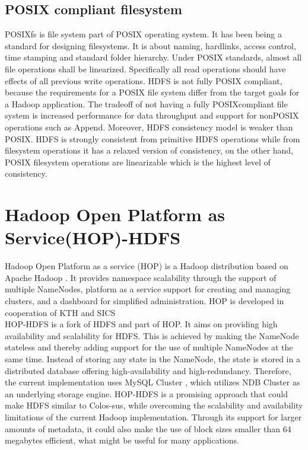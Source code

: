 \subsection{POSIX compliant filesystem}
POSIXfs   is   file  system   part  of  POSIX  operating  system.  It  has   been  being  a  standard  for
designing  filesystems.  It  is   about  naming,  hardlinks,  access   control,  time  stamping  and
standard  folder  hierarchy.  Under  POSIX  standards,  almost  all  file  operations   shall  be
linearized.  Specifically   all  read  operations   should  have  effects   of  all  previous   write
operations.
HDFS  is   not  fully  POSIX compliant, because the requirements  for a POSIX file system  differ
from   the  target  goals   for  a  Hadoop  application.  The  tradeoff  of  not  having  a  fully
POSIXcompliant  file  system   is   increased  performance  for  data  throughput  and  support  for
nonPOSIX  operations   such  as   Append.  Moreover,  HDFS  consistency   model  is   weaker
than  POSIX.  HDFS  is   strongly   consistent  from   primitive  HDFS  operations   while  from
filesystem   operations   it  has   a  relaxed  version  of  consistency,  on  the  other  hand,  POSIX
filesystem operations are linearizable which is the highest level of consistency.

\section{Hadoop Open Platform as Service(HOP)-HDFS}

Hadoop Open Platform as a service (HOP) \cite{10} is a Hadoop distribution based
on Apache Hadoop . It provides namespace scalability through the support of multiple
NameNodes, platform as a service support for creating and managing clusters,
and a dashboard for simplified administration. HOP is developed in cooperation
of KTH and SICS \cite{15}\\
HOP-HDFS\cite{11} \cite{12} is a fork of HDFS and part of HOP. It aims on providing high
availability and scalability for HDFS. This is achieved by making the NameNode
stateless and thereby adding support for the use of multiple NameNodes at the
same time. Instead of storing any state in the NameNode, the state is stored in
a distributed database offering high-availability and high-redundancy. Therefore,
the current implementation uses MySQL Cluster \cite{29}, which utilizes NDB Cluster
as an underlying storage engine.
HOP-HDFS is a promising approach that could make HDFS similar to Colos-sus, while overcoming the scalability and availability limitations of the current
Hadoop implementation. Through its support for larger amounts of metadata, it
could also make the use of block sizes smaller than 64 megabytes efficient, what
might be useful for many applications.



